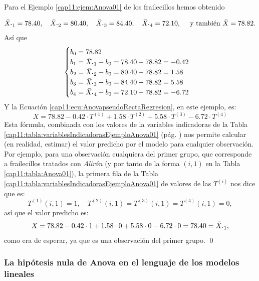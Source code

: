 \begin{ejemplo}
\label{cap11:ejem:EstimacionFrailecillosModeloLineal}

Para el Ejemplo \ref{cap11:ejem:Anova01} de los frailecillos hemos obtenido

\[
\bar X_{{\mbox{\bf\large$\cdot$}}1}=78.40,\quad
\bar X_{{\mbox{\bf\large$\cdot$}}2}=80.40,\quad
\bar X_{{\mbox{\bf\large$\cdot$}}3}=84.40,\quad
\bar X_{{\mbox{\bf\large$\cdot$}}4}=72.10,\quad
\mbox{ y también }\bar{X}=78.82.
\]
Así que
\[
\begin{cases}
b_0=78.82\\
b_1=\bar X_{{\mbox{\bf\large$\cdot$}}1}-b_0=78.40-78.82=-0.42\\
b_2=\bar X_{{\mbox{\bf\large$\cdot$}}2}-b_0=80.40-78.82=1.58\\
b_3=\bar X_{{\mbox{\bf\large$\cdot$}}3}-b_0=84.40-78.82=5.58\\
b_4=\bar X_{{\mbox{\bf\large$\cdot$}}4}-b_0=72.10-78.82=-6.72
\end{cases}
\]
Y la Ecuación \ref{cap11:ecu:AnovapseudoRectaRegresion}, en este ejemplo, es:
\[
X=
        78.82-0.42\cdot T^{(1)}+1.58\cdot T^{(2)}+5.58\cdot T^{(3)}-6.72\cdot T^{(4)}
\]
Esta fórmula, combinada con los valores de la variables indicadoras de la Tabla
\ref{cap11:tabla:variablesIndicadorasEjemploAnova01} (pág.
\pageref{cap11:tabla:variablesIndicadorasEjemploAnova01}) nos permite calcular (en realidad, estimar) el valor predicho por el modelo para cualquier observación. Por ejemplo, para una observación cualquiera del primer grupo, que corresponde a frailecillos tratados con {\em Alirón} (y por tanto de la forma $(i,1)$ en la Tabla \ref{cap11:tabla:Anova01}), la primera fila de
la Tabla \ref{cap11:tabla:variablesIndicadorasEjemploAnova01} de valores de las $T^{(i)}$ nos dice que es:
\[T^{(1)}(i,1)=1,\quad T^{(2)}(i,1)=T^{(3)}(i,1)=T^{(4)}(i,1)=0,\]
así que el valor predicho es:
\[
X=
        78.82-0.42\cdot 1+1.58\cdot 0+5.58\cdot 0-6.72\cdot 0= 78.40=\bar X_{{\mbox{\bf\large$\cdot$}}1},
\]
como era de esperar, ya que es una observación del primer grupo.
\qed
\end{ejemplo}

\subsubsection{La hipótesis nula de Anova en el lenguaje de los modelos lineales}

